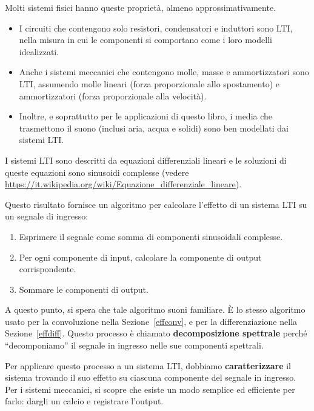 \documentclass[12pt]{book} \usepackage[width=5.5in,height=8.5in, hmarginratio=3:2,vmarginratio=1:1]{geometry}
\begin{document}
Molti sistemi fisici hanno queste proprietà, almeno approssimativamente.

\begin{itemize} 

\item I circuiti che contengono solo resistori, condensatori e induttori sono LTI, nella misura in cui le componenti si comportano come i loro modelli idealizzati.

\item Anche i sistemi meccanici che contengono molle, masse e ammortizzatori sono LTI, assumendo molle lineari (forza proporzionale allo spostamento) e ammortizzatori (forza proporzionale alla velocità).

\item Inoltre, e soprattutto per le applicazioni di questo libro, i media che trasmettono il suono (inclusi aria, acqua e solidi) sono ben modellati dai sistemi LTI.

\end{itemize} 

I sistemi LTI sono descritti da equazioni differenziali lineari e le soluzioni di queste equazioni sono sinusoidi complesse (vedere \url{https://it.wikipedia.org/wiki/Equazione_differenziale_lineare}).

Questo risultato fornisce un algoritmo per calcolare l'effetto di un sistema LTI su un segnale di ingresso:

\begin{enumerate} 

\item Esprimere il segnale come somma di componenti sinusoidali complesse.

\item Per ogni componente di input, calcolare la componente di output corrispondente.

\item Sommare le componenti di output.

\end{enumerate} 

A questo punto, si spera che tale algoritmo suoni familiare. È lo stesso algoritmo usato per la convoluzione nella Sezione~\ref{effconv}, e per la differenziazione nella Sezione~\ref{effdiff}. Questo processo è chiamato {\bf decomposizione spettrale} perché ``decomponiamo'' il segnale in ingresso nelle sue componenti spettrali.

Per applicare questo processo a un sistema LTI, dobbiamo {\bf caratterizzare} il sistema trovando il suo effetto su ciascuna componente del segnale in ingresso. Per i sistemi meccanici, si scopre che esiste un modo semplice ed efficiente per farlo: dargli un calcio e registrare l'output.
\end{document}
